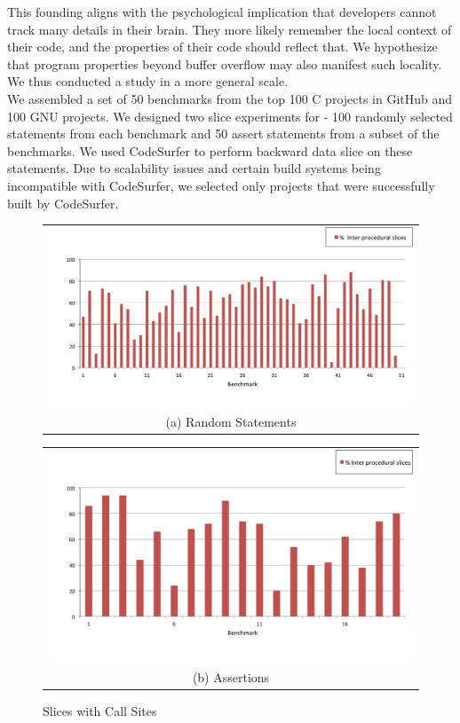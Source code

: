 \documentclass[12pt]{article}
\begin{document}
This founding aligns with the psychological implication that developers cannot track many details in their brain. They more likely remember the local context of their code, and the properties of their code should reflect that. We hypothesize that program properties beyond buffer overflow may also manifest such locality. We thus conducted a study in a more general scale.\\

We assembled a set of 50 benchmarks from the top 100 C projects in GitHub and 100 GNU projects. We designed two slice experiments for - 100 randomly selected statements from each benchmark and 50 assert statements from a subset of the benchmarks. We used CodeSurfer to perform backward data slice on these statements. Due to scalability issues and certain build systems being incompatible with CodeSurfer, we selected only projects that were successfully built by CodeSurfer. \\


\begin{figure}[H]
  \centering
  \begin{tabular}{@{}c@{}}
    \includegraphics[width=5in]{Inter-procedural-slices.png} \\[\abovecaptionskip]
    \small (a) Random Statements
  \end{tabular}

  \vspace{\floatsep}

  \begin{tabular}{@{}c@{}}
    \includegraphics[width=5in]{Inter-procedural-slices-assert.png} \\[\abovecaptionskip]
    \small (b) Assertions
  \end{tabular}
  
  \caption{Slices with Call Sites}\label{slice with call sites}
\end{figure}
\end{document}
